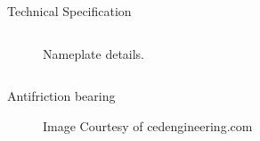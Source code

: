 \documentclass{beamer}
\begin{document}
\begin{frame}{Technical Specification}
  
  \begin{columns}
  
        \begin{column}{0.4\textwidth} %
    \begin{figure}
        \centering
        \caption{Nameplate details.}
    \end{figure}
    \end{column}
    
    \begin{column}{0.6\textwidth} 
    \begin{figure}
        \centering
    \end{figure}
    \end{column}

  \end{columns}
\end{frame}




\begin{frame}{Antifriction bearing}

    \begin{figure}
        \centering
        \caption{Image Courtesy of cedengineering.com}
    \end{figure}    
\end{frame}
\end{document}
